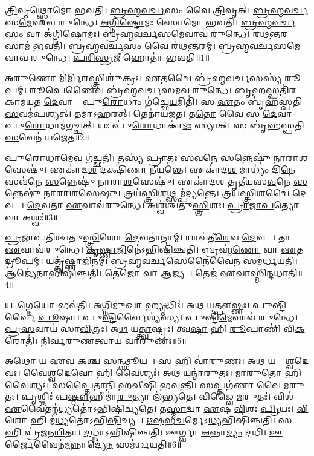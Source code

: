 \ul{𑌤𑍍𑌰𑌿}𑌵𑍃𑌥𑍍𑌸𑍍𑌤𑍋𑌮𑍋॑ 𑌭𑌵𑌤𑌿।
\ul{𑌬𑍍𑌰}\ul{𑌹𑍍𑌮}\ul{𑌵}\ul{𑌰𑍍𑌚}𑌸𑌂 𑌵𑍈 \ul{𑌤𑍍𑌰𑌿}𑌵𑍃𑌤𑍍।
\ul{𑌬𑍍𑌰}\ul{𑌹𑍍𑌮}\ul{𑌵}\ul{𑌰𑍍𑌚}𑌸\ul{𑌮𑍇}𑌵𑌾𑌵॑ 𑌰𑍁𑌨𑍍𑌧𑍇।
\ul{𑌅}\ul{𑌗𑍍𑌨𑌿}\ul{𑌷𑍍𑌟𑍋}𑌮𑌃 𑌸𑍋𑌮𑍋॑ 𑌭𑌵𑌤𑌿।
\ul{𑌬𑍍𑌰}\ul{𑌹𑍍𑌮}\ul{𑌵}\ul{𑌰𑍍𑌚}𑌸𑌂 𑌵𑌾 𑌅॑𑌗𑍍𑌨𑌿\ul{𑌷𑍍𑌟𑍋}𑌮𑌃।
\ul{𑌬𑍍𑌰}\ul{𑌹𑍍𑌮}\ul{𑌵}\ul{𑌰𑍍𑌚}𑌸\ul{𑌮𑍇}𑌵𑌾𑌵॑ 𑌰𑍁𑌨𑍍𑌧𑍇।
\ul{𑌰}\ul{𑌥}\ul{𑌨𑍍𑌤}𑌰 𑌸𑌾𑌮॑ 𑌭𑌵𑌤𑌿।
\ul{𑌬𑍍𑌰}\ul{𑌹𑍍𑌮}\ul{𑌵}\ul{𑌰𑍍𑌚}𑌸𑌂 𑌵𑍈 𑌰॑𑌥\ul{𑌨𑍍𑌤}𑌰𑌮𑍍।
\ul{𑌬𑍍𑌰}\ul{𑌹𑍍𑌮}\ul{𑌵}\ul{𑌰𑍍𑌚}𑌸\ul{𑌮𑍇}𑌵𑌾𑌵॑ 𑌰𑍁𑌨𑍍𑌧𑍇।
\ul{𑌪}\ul{𑌰𑌿}\ul{𑌸𑍍𑌰}𑌜𑍀 𑌹𑍋𑌤𑌾॑ 𑌭𑌵𑌤𑌿॥1॥

\ul{𑌅}\ul{𑌰𑍁}𑌣𑍋 𑌮𑌿॑\ul{𑌰𑍍𑌮𑌿}𑌰𑌸𑍍𑌤𑍍𑌰𑌿𑌶𑍁॑𑌕𑍍𑌰𑌃।
\ul{𑌏}𑌤𑌦𑍍𑌵𑍈 𑌬𑍍𑌰॑𑌹𑍍𑌮𑌵\ul{𑌰𑍍𑌚}𑌸𑌸𑍍𑌯॑ \ul{𑌰𑍂}𑌪𑌮𑍍।
\ul{𑌰𑍂}𑌪𑍇\ul{𑌣𑍈}𑌵 𑌬𑍍𑌰॑𑌹𑍍𑌮𑌵\ul{𑌰𑍍𑌚}𑌸𑌮𑌵॑ 𑌰𑍁𑌨𑍍𑌧𑍇। 
𑌬𑍃\ul{𑌹}𑌸𑍍𑌪𑌤𑌿॑𑌰𑌕𑌾𑌮𑌯𑌤 \ul{𑌦𑍇}𑌵𑌾𑌨𑌾𑌂᳚ 𑌪𑍁\ul{𑌰𑍋}𑌧𑌾𑌂 𑌗॑𑌚𑍍𑌛𑍇\ul{𑌯}𑌮𑌿𑌤𑌿॑।
𑌸 \ul{𑌏}𑌤𑌂 𑌬𑍃॑𑌹𑌸𑍍𑌪𑌤𑌿\ul{𑌸}𑌵𑌮॑𑌪𑌶𑍍𑌯𑌤𑍍।
𑌤𑌮𑌾𑌽𑌹॑𑌰𑌤𑍍।
𑌤𑍇𑌨𑌾॑𑌯𑌜𑌤।
𑌤\ul{𑌤𑍋} 𑌵𑍈 𑌸 \ul{𑌦𑍇}𑌵𑌾𑌨𑌾𑌂᳚ 𑌪𑍁\ul{𑌰𑍋}𑌧𑌾𑌮॑𑌗𑌚𑍍𑌛𑌤𑍍।
𑌯𑌃 𑌪𑍁॑\ul{𑌰𑍋}𑌧𑌾𑌕𑌾॑\ul{𑌮𑌃} 𑌸𑍍𑌯𑌾𑌤𑍍।
𑌸 𑌬𑍃॑𑌹𑌸𑍍𑌪𑌤𑌿\ul{𑌸}𑌵𑍇𑌨॑ 𑌯𑌜𑍇𑌤॥2॥

\ul{𑌪𑍁}\ul{𑌰𑍋}𑌧𑌾\ul{𑌮𑍇}𑌵 𑌗॑𑌚𑍍𑌛𑌤𑌿।
𑌤𑌸𑍍𑌯॑ 𑌪𑍍𑌰𑌾𑌤𑌃 𑌸\ul{𑌵}𑌨𑍇 \ul{𑌸}𑌨𑍍𑌨𑍇𑌷𑍁॑ 𑌨𑌾𑌰𑌾\ul{𑌶}\ul{}𑌸𑍇𑌷𑍁॑।
𑌏𑌕𑌾॑𑌦\ul{𑌶} 𑌦𑌕𑍍𑌷𑌿॑𑌣𑌾 𑌨𑍀𑌯𑌨𑍍𑌤𑍇।
𑌏𑌕𑌾॑𑌦\ul{𑌶} 𑌮𑌾𑌧𑍍𑌯𑌂॑ 𑌦𑌿\ul{𑌨𑍇} 𑌸𑌵॑𑌨𑍇 \ul{𑌸}𑌨𑍍𑌨𑍇𑌷𑍁॑ 𑌨𑌾𑌰𑌾\ul{𑌶}\ul{}𑌸𑍇𑌷𑍁॑।
𑌏𑌕𑌾॑𑌦𑌶 𑌤𑍃𑌤𑍀𑌯𑌸\ul{𑌵}𑌨𑍇 \ul{𑌸}𑌨𑍍𑌨𑍇𑌷𑍁॑ 𑌨𑌾𑌰𑌾\ul{𑌶}\ul{}𑌸𑍇𑌷𑍁॑।
𑌤𑍍𑌰𑌯॑𑌸𑍍𑌤𑍍𑌰𑌿\ul{𑌶}𑌥𑍍𑌸𑌮𑍍𑌪॑𑌦𑍍𑌯𑌨𑍍𑌤𑍇।
𑌤𑍍𑌰𑌯॑𑌸𑍍𑌤𑍍𑌰𑌿\ul{𑌶}𑌦𑍍𑌵𑍈 \ul{𑌦𑍇}𑌵𑌤𑌾𑌃᳚।
\ul{𑌦𑍇}𑌵𑌤𑌾॑ \ul{𑌏}𑌵𑌾𑌵॑𑌰𑍁𑌨𑍍𑌧𑍇।
𑌅𑌶𑍍𑌵॑𑌶𑍍𑌚𑌤𑍁\ul{𑌸𑍍𑌤𑍍𑌰𑌿}\ul{}𑌶𑌃।
\ul{𑌪𑍍𑌰𑌾}\ul{𑌜𑌾}\ul{𑌪}𑌤𑍍𑌯𑍋 𑌵𑌾 𑌅𑌶𑍍𑌵𑌃॑॥3॥

\ul{𑌪𑍍𑌰}𑌜𑌾𑌪॑𑌤𑌿𑌶𑍍𑌚𑌤𑍁\ul{𑌸𑍍𑌤𑍍𑌰𑌿}\ul{}𑌶𑍋 \ul{𑌦𑍇}𑌵𑌤𑌾॑𑌨𑌾𑌮𑍍।
𑌯𑌾𑌵॑𑌤𑍀\ul{𑌰𑍇}𑌵 \ul{𑌦𑍇}𑌵𑌤𑌾𑌃᳚।
𑌤𑌾 \ul{𑌏}𑌵𑌾𑌵॑𑌰𑍁𑌨𑍍𑌧𑍇।
\ul{𑌕𑍃}\ul{𑌷𑍍𑌣𑌾}\ul{𑌜𑌿}𑌨𑍇॑\-𑌽𑌭𑌿𑌷𑌿॑𑌞𑍍𑌚𑌤𑌿।
𑌬𑍍𑌰𑌹𑍍𑌮॑\ul{𑌣𑍋} 𑌵𑌾 \ul{𑌏}𑌤\ul{𑌦𑍍𑌰𑍂}𑌪𑌮𑍍।
𑌯𑌤𑍍𑌕𑍃॑𑌷𑍍𑌣𑌾\ul{𑌜𑌿}𑌨𑌮𑍍।
\ul{𑌬𑍍𑌰}\ul{𑌹𑍍𑌮}\ul{𑌵}\ul{𑌰𑍍𑌚}𑌸𑍇\ul{𑌨𑍈}𑌵𑍈\ul{𑌨}\ul{} 𑌸𑌮॑𑌰𑍍𑌧𑌯𑌤𑌿।
𑌆𑌜𑍍𑌯𑍇॑\ul{𑌨𑌾}𑌭𑌿𑌷𑌿॑𑌞𑍍𑌚𑌤𑌿।
𑌤𑍇\ul{𑌜𑍋} 𑌵𑌾 𑌆𑌜𑍍𑌯𑌮𑍍᳚।
𑌤𑍇𑌜॑ \ul{𑌏}𑌵𑌾𑌸𑍍𑌮𑌿॑𑌨𑍍𑌦𑌧𑌾𑌤𑌿॥4॥\anuvakamend[𑌹𑍋𑌤𑌾॑ 𑌭𑌵𑌤𑌿 𑌯𑌜𑍇\ul{𑌤} 𑌵𑌾 𑌅𑌶𑍍𑌵𑍋॑ 𑌦𑌧𑌾𑌤𑌿]

𑌯𑌦𑌾᳚\ul{𑌗𑍍𑌨𑍇}𑌯𑍋 𑌭𑌵॑𑌤𑌿।
\ul{𑌅}𑌗𑍍𑌨𑌿𑌮𑍁॑\ul{𑌖𑌾} 𑌹𑍍𑌯𑍃𑌦𑍍𑌧𑌿𑌃॑।
𑌅\ul{𑌥} 𑌯\ul{𑌤𑍍𑌪𑍗}𑌷𑍍𑌣𑌃।
𑌪𑍁\ul{𑌷𑍍𑌟𑌿}𑌰𑍍𑌵𑍈 \ul{𑌪𑍂}𑌷𑌾।
𑌪𑍁\ul{𑌷𑍍𑌟𑌿}𑌰𑍍𑌵𑍈𑌶𑍍𑌯॑𑌸𑍍𑌯।
𑌪𑍁𑌷𑍍𑌟𑌿॑\ul{𑌮𑍇}𑌵𑌾𑌵॑ 𑌰𑍁𑌨𑍍𑌧𑍇।
\ul{𑌪𑍍𑌰}\ul{𑌸}𑌵𑌾𑌯॑ 𑌸𑌾\ul{𑌵𑌿}𑌤𑍍𑌰𑌃।
𑌅\ul{𑌥} 𑌯\ul{𑌤𑍍𑌤𑍍𑌵𑌾}𑌷𑍍𑌟𑍍𑌰𑌃।
𑌤𑍍𑌵\ul{𑌷𑍍𑌟𑌾} 𑌹𑌿 \ul{𑌰𑍂}𑌪𑌾𑌣𑌿॑ 𑌵𑌿\ul{𑌕}𑌰𑍋𑌤𑌿॑।
\ul{𑌨𑌿}\ul{𑌰𑍍𑌵}\ul{𑌰𑍁}\ul{𑌣}𑌤𑍍𑌵𑌾𑌯॑ 𑌵𑌾\ul{𑌰𑍁}𑌣𑌃॥5॥

𑌅\ul{𑌥𑍋} 𑌯 \ul{𑌏}𑌵 𑌕\ul{𑌶𑍍𑌚} 𑌸\ul{𑌨𑍍𑌥𑍍𑌸𑍂}𑌯𑌤𑍇᳚।
𑌸 𑌹𑌿 𑌵𑌾॑\ul{𑌰𑍁}𑌣𑌃।
𑌅\ul{𑌥} 𑌯𑌦𑍍𑌵𑍈᳚𑌶𑍍𑌵\ul{𑌦𑍇}𑌵𑌃।
\ul{𑌵𑍈}\ul{𑌶𑍍𑌵}\ul{𑌦𑍇}𑌵𑍋 𑌹𑌿 𑌵𑍈𑌶𑍍𑌯𑌃॑।
𑌅\ul{𑌥} 𑌯𑌨𑍍𑌮𑌾॑\ul{𑌰𑍁}𑌤𑌃।
\ul{𑌮𑌾}\ul{𑌰𑍁}𑌤𑍋 𑌹𑌿 𑌵𑍈𑌶𑍍𑌯𑌃॑।
\ul{𑌸}𑌪𑍍𑌤𑍈𑌤𑌾𑌨𑌿॑ \ul{𑌹}𑌵𑍀𑌷𑌿॑ 𑌭𑌵𑌨𑍍𑌤𑌿।
\ul{𑌸}𑌪𑍍𑌤𑌗॑\ul{𑌣𑌾} 𑌵𑍈 \ul{𑌮}𑌰𑍁𑌤𑌃॑।
𑌪𑍃𑌶𑍍𑌞𑌿𑌃॑ 𑌪\ul{𑌷𑍍𑌠𑍗}𑌹𑍀 𑌮𑌾॑\ul{𑌰𑍁}𑌤𑍍𑌯𑌾 𑌲॑𑌭𑍍𑌯𑌤𑍇।
𑌵𑌿𑌡𑍍𑌵𑍈 \ul{𑌮}𑌰𑍁𑌤𑌃॑।
𑌵𑌿𑌶॑ \ul{𑌏}𑌵𑍈𑌤𑌨𑍍𑌮॑\ul{𑌧𑍍𑌯}𑌤𑍋॑\-𑌽𑌭𑌿𑌷𑌿॑𑌚𑍍𑌯𑌤𑍇।
𑌤\ul{𑌸𑍍𑌮𑌾}𑌦𑍍𑌵𑌾 \ul{𑌏}𑌷 \ul{𑌵𑌿}𑌶𑌃 \ul{𑌪𑍍𑌰𑌿}𑌯𑌃।
\ul{𑌵𑌿}𑌶𑍋 𑌹𑌿 𑌮॑\ul{𑌧𑍍𑌯}𑌤𑍋॑\-𑌽𑌭𑌿\ul{𑌷𑌿}𑌚𑍍𑌯𑌤𑍇᳚।
\ul{𑌋}\ul{𑌷}\ul{𑌭}\ul{𑌚}𑌰𑍍𑌮𑍇\-𑌽\ul{𑌧𑍍𑌯}𑌭𑌿𑌷𑌿॑𑌞𑍍𑌚𑌤𑌿।
𑌸 𑌹𑌿 𑌪𑍍𑌰॑𑌜𑌨\ul{𑌯𑌿}𑌤𑌾।
\ul{𑌦}𑌧𑍍𑌨𑌾\-𑌽𑌭𑌿𑌷𑌿॑𑌞𑍍𑌚𑌤𑌿।
𑌊𑌰𑍍𑌗𑍍𑌵𑌾 \ul{𑌅}𑌨𑍍𑌨𑌾\ul{𑌦𑍍𑌯𑌂} 𑌦𑌧𑌿॑।
\ul{𑌊}𑌰𑍍𑌜𑍈𑌵𑍈𑌨॑\ul{𑌮}𑌨𑍍𑌨𑌾𑌦𑍍𑌯𑍇॑\ul{𑌨} 𑌸𑌮॑𑌰𑍍𑌧𑌯𑌤𑌿॥6॥\anuvakamend[\ul{𑌵𑌾}\ul{𑌰𑍁}𑌣𑍋 𑌵𑌿𑌡𑍍𑌵𑍈 \ul{𑌮}𑌰𑍁\ul{𑌤𑍋}\-𑌽𑌷𑍍𑌟𑍗 𑌚॑]

